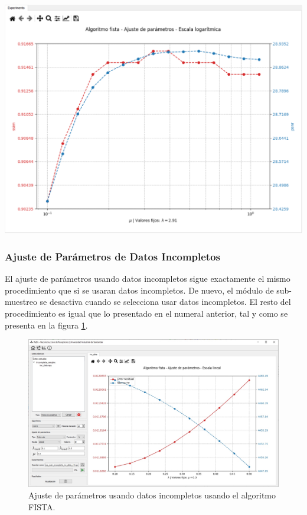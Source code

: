 \documentclass[12pt,twoside,letter]{ol-softwaremanual}
\newenvironment{Figure}
  {\par\medskip\noindent\minipage{\linewidth}}
  {\endminipage\par\medskip}
\begin{document}
\begin{Figure}
    \centering
    \includegraphics[width=1\linewidth]{tuning-2.png}
    \label{fig:tuning_2}
\end{Figure}

\subsubsection{Ajuste de Parámetros de Datos Incompletos}

El ajuste de parámetros usando datos incompletos sigue exactamente el mismo procedimiento que si se usaran datos incompletos. De nuevo, el módulo de sub-muestreo se desactiva cuando se selecciona usar datos incompletos. El resto del procedimiento es igual que lo presentado en el numeral anterior, tal y como se presenta en la figura \ref{fig:tuninginc}.

\begin{figure}
	\centering
	\includegraphics[width=1\linewidth]{figures/tuninginc}
	\caption{Ajuste de parámetros usando datos incompletos usando el algoritmo FISTA.}
	\label{fig:tuninginc}
\end{figure}
\end{document}
